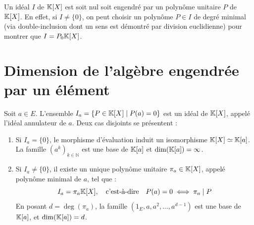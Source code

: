 \documentclass[11pt,a4paper]{report}
\begin{document}
\begin{rappel}
    Un idéal $I$ de $\mathbb{K}[X]$ est soit nul soit engendré par un polynôme unitaire $P$ de $\mathbb{K}[X]$. En effet, si $I \neq \{0\}$, on peut choisir un polynôme $P \in I$ de degré minimal (via double-inclusion dont un sens est démontré par division euclidienne) pour montrer que $I = P_0 \mathbb{K}[X]$.
\end{rappel}

\chapter{Dimension de l'algèbre engendrée par un élément}

\begin{property}
    Soit $a \in E$. L'ensemble $I_a = \{P \in \mathbb{K}[X] \mid P(a) = 0\}$ est un idéal de $\mathbb{K}[X]$, appelé l'idéal annulateur de $a$. Deux cas disjoints se présentent :
    \begin{enumerate}
        \item Si $I_a = \{0\}$, le morphisme d'évaluation induit un isomorphisme $\mathbb{K}[X] \simeq \mathbb{K}[a]$. La famille $(a^k)_{k \in \mathbb{N}}$ est une base de $\mathbb{K}[a]$ et $\dim(\mathbb{K}[a]) = \infty$.
        \item Si $I_a \neq \{0\}$, il existe un unique polynôme unitaire $\pi_a \in \mathbb{K}[X]$, appelé polynôme minimal de $a$, tel que :
        \[
            I_a = \pi_a \mathbb{K}[X], \quad \text{c'est-à-dire} \quad P(a) = 0 \iff \pi_a \mid P
        \]
        En posant $d = \deg(\pi_a)$, la famille $(1_E, a, a^2, \dots, a^{d-1})$ est une base de $\mathbb{K}[a]$, et $\dim(\mathbb{K}[a]) = d$.
    \end{enumerate}
\end{property}
\end{document}
